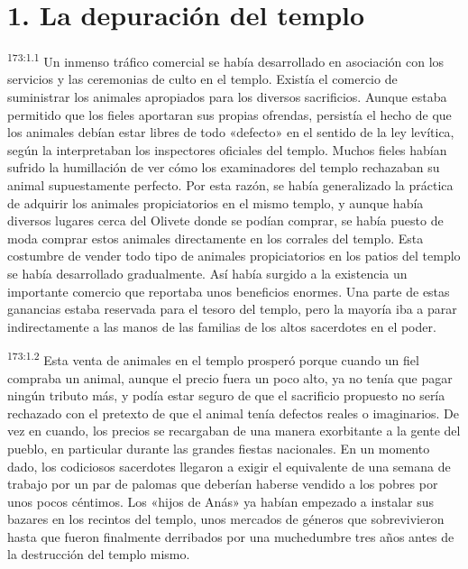 \section*{1. La depuración del templo}
\par 
\textsuperscript{173:1.1} Un inmenso tráfico comercial se había desarrollado en asociación con los servicios y las ceremonias de culto en el templo. Existía el comercio de suministrar los animales apropiados para los diversos sacrificios. Aunque estaba permitido que los fieles aportaran sus propias ofrendas, persistía el hecho de que los animales debían estar libres de todo «defecto» en el sentido de la ley levítica, según la interpretaban los inspectores oficiales del templo. Muchos fieles habían sufrido la humillación de ver cómo los examinadores del templo rechazaban su animal supuestamente perfecto. Por esta razón, se había generalizado la práctica de adquirir los animales propiciatorios en el mismo templo, y aunque había diversos lugares cerca del Olivete donde se podían comprar, se había puesto de moda comprar estos animales directamente en los corrales del templo. Esta costumbre de vender todo tipo de animales propiciatorios en los patios del templo se había desarrollado gradualmente. Así había surgido a la existencia un importante comercio que reportaba unos beneficios enormes. Una parte de estas ganancias estaba reservada para el tesoro del templo, pero la mayoría iba a parar indirectamente a las manos de las familias de los altos sacerdotes en el poder.

\par 
\textsuperscript{173:1.2} Esta venta de animales en el templo prosperó porque cuando un fiel compraba un animal, aunque el precio fuera un poco alto, ya no tenía que pagar ningún tributo más, y podía estar seguro de que el sacrificio propuesto no sería rechazado con el pretexto de que el animal tenía defectos reales o imaginarios. De vez en cuando, los precios se recargaban de una manera exorbitante a la gente del pueblo, en particular durante las grandes fiestas nacionales. En un momento dado, los codiciosos sacerdotes llegaron a exigir el equivalente de una semana de trabajo por un par de palomas que deberían haberse vendido a los pobres por unos pocos céntimos. Los «hijos de Anás» ya habían empezado a instalar sus bazares en los recintos del templo, unos mercados de géneros que sobrevivieron hasta que fueron finalmente derribados por una muchedumbre tres años antes de la destrucción del templo mismo.

